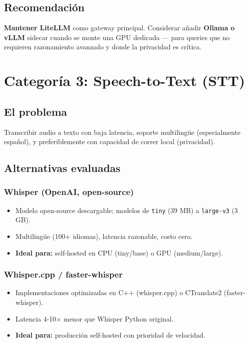 \documentclass[11pt,a4paper]{article}
\begin{document}
\subsection{Recomendación}

\textbf{Mantener LiteLLM} como gateway principal. Considerar añadir \textbf{Ollama o vLLM} sidecar cuando se monte una GPU dedicada — para queries que no requieren razonamiento avanzado y donde la privacidad es crítica.

\newpage

\section{Categoría 3: Speech-to-Text (STT)}

\subsection{El problema}

Transcribir audio a texto con baja latencia, soporte multilingüe (especialmente español), y preferiblemente con capacidad de correr local (privacidad).

\subsection{Alternativas evaluadas}

\subsubsection{Whisper (OpenAI, open-source)}
\begin{itemize}[leftmargin=*,itemsep=0pt]
\item Modelo open-source descargable; modelos de \texttt{tiny} (39 MB) a \texttt{large-v3} (3 GB).
\item Multilingüe (100+ idiomas), latencia razonable, costo cero.
\item \textbf{Ideal para:} self-hosted en CPU (tiny/base) o GPU (medium/large).
\end{itemize}

\subsubsection{Whisper.cpp / faster-whisper}
\begin{itemize}[leftmargin=*,itemsep=0pt]
\item Implementaciones optimizadas en C++ (whisper.cpp) o CTranslate2 (faster-whisper).
\item Latencia 4-10× menor que Whisper Python original.
\item \textbf{Ideal para:} producción self-hosted con prioridad de velocidad.
\end{itemize}
\end{document}
